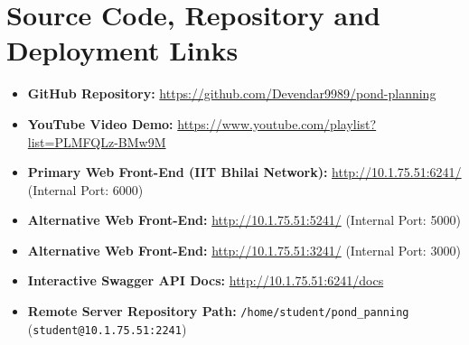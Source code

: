 \documentclass[manuscript,screen,review]{acmart}
\begin{document}
\appendix

\section{Source Code, Repository and Deployment Links}
\begin{itemize}[noitemsep]
    \item \textbf{GitHub Repository:} \url{https://github.com/Devendar9989/pond-planning}
    \item \textbf{YouTube Video Demo:} \url{https://www.youtube.com/playlist?list=PLMFQLz-BMw9M}
    \item \textbf{Primary Web Front-End (IIT Bhilai Network):} \url{http://10.1.75.51:6241/} (Internal Port: 6000)
    \item \textbf{Alternative Web Front-End:} \url{http://10.1.75.51:5241/} (Internal Port: 5000)
    \item \textbf{Alternative Web Front-End:} \url{http://10.1.75.51:3241/} (Internal Port: 3000)
    \item \textbf{Interactive Swagger API Docs:} \url{http://10.1.75.51:6241/docs}
    \item \textbf{Remote Server Repository Path:} \texttt{/home/student/pond\_panning} (\texttt{student@10.1.75.51:2241})
\end{itemize}
\end{document}
